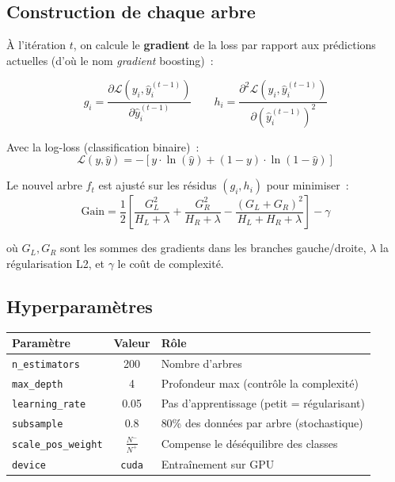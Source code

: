\documentclass[12pt,a4paper]{article}
\begin{document}
\subsection{Construction de chaque arbre}

\`A l'it\'eration $t$, on calcule le \textbf{gradient} de la loss par rapport aux pr\'edictions actuelles (d'o\`u le nom \textit{gradient} boosting)~:

\begin{equation}
    g_i = \frac{\partial \mathcal{L}(y_i, \hat{y}_i^{(t-1)})}{\partial \hat{y}_i^{(t-1)}}
    \qquad
    h_i = \frac{\partial^2 \mathcal{L}(y_i, \hat{y}_i^{(t-1)})}{\partial (\hat{y}_i^{(t-1)})^2}
    \label{eq:grad}
\end{equation}

Avec la log-loss (classification binaire)~:
\begin{equation}
    \mathcal{L}(y, \hat{y}) = -\left[y \cdot \ln(\hat{y}) + (1-y) \cdot \ln(1-\hat{y})\right]
\end{equation}

Le nouvel arbre $f_t$ est ajust\'e sur les r\'esidus $(g_i, h_i)$ pour minimiser~:
\begin{equation}
    \text{Gain} = \frac{1}{2}\left[\frac{G_L^2}{H_L + \lambda} + \frac{G_R^2}{H_R + \lambda} - \frac{(G_L + G_R)^2}{H_L + H_R + \lambda}\right] - \gamma
    \label{eq:gain}
\end{equation}

o\`u $G_L, G_R$ sont les sommes des gradients dans les branches gauche/droite, $\lambda$ la r\'egularisation L2, et $\gamma$ le co\^ut de complexit\'e.

\subsection{Hyperparamètres}

\begin{center}
\begin{tabular}{lcp{6cm}}
\toprule
\textbf{Param\`etre} & \textbf{Valeur} & \textbf{R\^ole} \\
\midrule
\texttt{n\_estimators} & 200 & Nombre d'arbres \\
\texttt{max\_depth} & 4 & Profondeur max (contr\^ole la complexit\'e) \\
\texttt{learning\_rate} & 0.05 & Pas d'apprentissage (petit = r\'egularisant) \\
\texttt{subsample} & 0.8 & 80\% des donn\'ees par arbre (stochastique) \\
\texttt{scale\_pos\_weight} & $\frac{N^-}{N^+}$ & Compense le d\'es\'equilibre des classes \\
\texttt{device} & \texttt{cuda} & Entra\^inement sur GPU \\
\bottomrule
\end{tabular}
\end{center}
\end{document}
